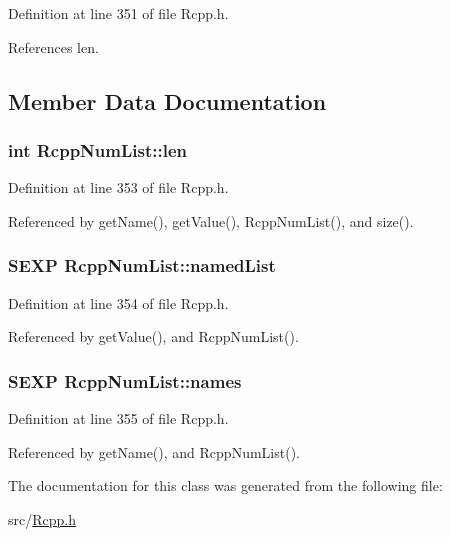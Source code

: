 Definition at line 351 of file Rcpp.h.

References len.

\subsection{Member Data Documentation}
\hypertarget{classRcppNumList_c4cb5c784f7105f0f28ae48d02deb3a1}{
\subsubsection[{len}]{\setlength{\rightskip}{0pt plus 5cm}int {\bf RcppNumList::len}}}
\label{classRcppNumList_c4cb5c784f7105f0f28ae48d02deb3a1}




Definition at line 353 of file Rcpp.h.

Referenced by getName(), getValue(), RcppNumList(), and size().\hypertarget{classRcppNumList_7464927aafe555a0c4a104247dba7185}{
\subsubsection[{namedList}]{\setlength{\rightskip}{0pt plus 5cm}SEXP {\bf RcppNumList::namedList}}}
\label{classRcppNumList_7464927aafe555a0c4a104247dba7185}




Definition at line 354 of file Rcpp.h.

Referenced by getValue(), and RcppNumList().\hypertarget{classRcppNumList_a669b28cba0c95531a3c92910a60ecb0}{
\subsubsection[{names}]{\setlength{\rightskip}{0pt plus 5cm}SEXP {\bf RcppNumList::names}}}
\label{classRcppNumList_a669b28cba0c95531a3c92910a60ecb0}




Definition at line 355 of file Rcpp.h.

Referenced by getName(), and RcppNumList().

The documentation for this class was generated from the following file:\begin{CompactItemize}
\item 
src/\hyperlink{Rcpp_8h}{Rcpp.h}\end{CompactItemize}
